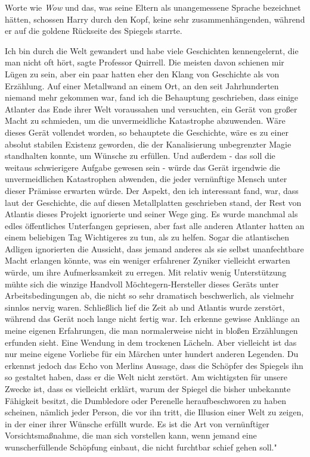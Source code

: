 Worte wie \glqq{}\emph{Wow}\grqq{} und das, was seine Eltern als unangemessene
Sprache bezeichnet hätten, schossen Harry durch den Kopf, keine sehr
zusammenhängenden, während er auf die goldene Rückseite des Spiegels starrte.

\glqq{}Ich bin durch die Welt gewandert und habe viele Geschichten kennengelernt,
die man nicht oft hört\grqq{}, sagte Professor Quirrell. \glqq{}Die meisten davon
schienen mir Lügen zu sein, aber ein paar hatten eher den Klang von Geschichte
als von Erzählung. Auf einer Metallwand an einem Ort, an den seit Jahrhunderten
niemand mehr gekommen war, fand ich die Behauptung geschrieben, dass einige
Atlanter das Ende ihrer Welt voraussahen und versuchten, ein Gerät von großer
Macht zu schmieden, um die unvermeidliche Katastrophe abzuwenden. Wäre dieses
Gerät vollendet worden, so behauptete die Geschichte, wäre es zu einer absolut
stabilen Existenz geworden, die der Kanalisierung unbegrenzter Magie standhalten
konnte, um Wünsche zu erfüllen. Und außerdem - das soll die weitaus schwierigere
Aufgabe gewesen sein - würde das Gerät irgendwie die unvermeidlichen
Katastrophen abwenden, die jeder vernünftige Mensch unter dieser Prämisse
erwarten würde. Der Aspekt, den ich interessant fand, war, dass laut der
Geschichte, die auf diesen Metallplatten geschrieben stand, der Rest von
Atlantis dieses Projekt ignorierte und seiner Wege ging. Es wurde manchmal als
edles öffentliches Unterfangen gepriesen, aber fast alle anderen Atlanter hatten
an einem beliebigen Tag Wichtigeres zu tun, als zu helfen. Sogar die
atlantischen Adligen ignorierten die Aussicht, dass jemand anderes als sie
selbst unanfechtbare Macht erlangen könnte, was ein weniger erfahrener Zyniker
vielleicht erwarten würde, um ihre Aufmerksamkeit zu erregen. Mit relativ wenig
Unterstützung mühte sich die winzige Handvoll Möchtegern-Hersteller dieses
Geräts unter Arbeitsbedingungen ab, die nicht so sehr dramatisch beschwerlich,
als vielmehr sinnlos nervig waren. Schließlich lief die Zeit ab und Atlantis
wurde zerstört, während das Gerät noch lange nicht fertig war. Ich erkenne
gewisse Anklänge an meine eigenen Erfahrungen, die man normalerweise nicht in
bloßen Erzählungen erfunden sieht.\grqq{} Eine Wendung in dem trockenen Lächeln.
\glqq{}Aber vielleicht ist das nur meine eigene Vorliebe für ein Märchen unter
hundert anderen Legenden. Du erkennst jedoch das Echo von Merlins Aussage, dass
die Schöpfer des Spiegels ihn so gestaltet haben, dass er die Welt nicht
zerstört. Am wichtigsten für unsere Zwecke ist, dass es vielleicht erklärt,
warum der Spiegel die bisher unbekannte Fähigkeit besitzt, die Dumbledore oder
Perenelle heraufbeschworen zu haben scheinen, nämlich jeder Person, die vor ihn
tritt, die Illusion einer Welt zu zeigen, in der einer ihrer Wünsche erfüllt
wurde. Es ist die Art von vernünftiger Vorsichtsmaßnahme, die man sich
vorstellen kann, wenn jemand eine wunscherfüllende Schöpfung einbaut, die nicht
furchtbar schief gehen soll."

